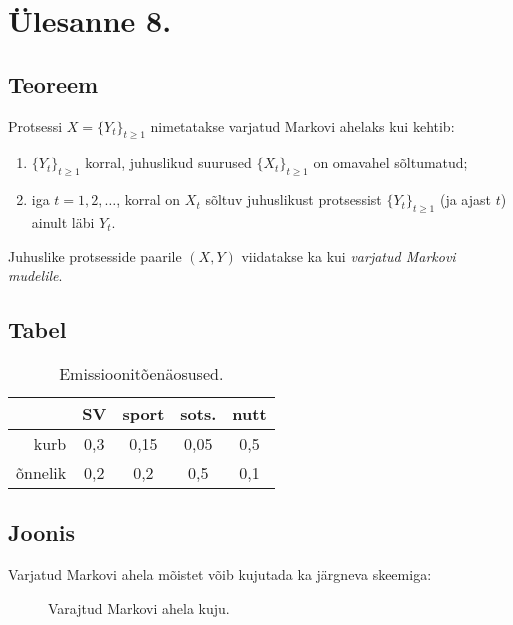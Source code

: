 \section{Ülesanne 8.}

\subsection{Teoreem}

\begin{definition}%
	Protsessi $X = \{Y_t\}_{t\geqslant1}$ nimetatakse varjatud Markovi ahelaks kui kehtib:

	\begin{enumerate}
		\item $\{Y_t\}_{t\geqslant1}$ korral, juhuslikud suurused $\{X_t\}_{t\geqslant1}$ on omavahel sõltumatud;
		\item iga $t = 1,2,\dots$, korral on $X_t$ sõltuv juhuslikust protsessist $\{Y_t\}_{t\geqslant1}$ (ja ajast $t$) ainult läbi $Y_t$.
	\end{enumerate}

	Juhuslike protsesside paarile $(X, Y)$ viidatakse ka kui \textit{varjatud Markovi mudelile}.
\end{definition}

\subsection{Tabel}

\begin{table}[h]
	\centering
	\begin{tabular}{ r | *{4}{c} }	
						& SV 	& sport & sots. & nutt\\
		\hline
			 kurb & 0,3 & 0,15	 & 0,05 & 0,5 \\
		õnnelik & 0,2	& 0,2   & 0,5	& 0,1 \\
	\end{tabular}

	\caption{Emissioonitõenäosused.}
	\label{fig:HMM.ex.emission}
\end{table}

\subsection{Joonis}

Varjatud Markovi ahela mõistet võib kujutada ka järgneva skeemiga:

\begin{figure}[h]
	\centering
	
	\caption{Varajtud Markovi ahela kuju.}
	\label{fig:HMM}
\end{figure}

